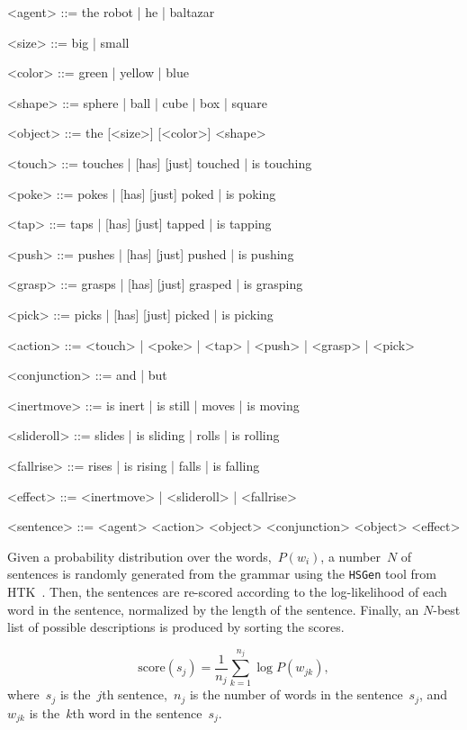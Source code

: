 \begin{grammar}
  <agent> ::= the robot | he | baltazar

  <size> ::= big | small

  <color> ::= green | yellow | blue

  <shape> ::= sphere | ball | cube | box | square

  <object> ::= the [<size>] [<color>] <shape>

  <touch> ::= touches | [has] [just] touched | is touching

  <poke> ::= pokes | [has] [just] poked | is poking

  <tap> ::= taps | [has] [just] tapped | is tapping

  <push> ::= pushes | [has] [just] pushed | is pushing

  <grasp> ::= grasps | [has] [just] grasped | is grasping

  <pick> ::= picks | [has] [just] picked | is picking

  <action> ::= <touch> | <poke> | <tap> | <push> | <grasp> | <pick>

  <conjunction> ::= and | but

  <inertmove> ::= is inert | is still | moves | is moving

  <slideroll> ::= slides | is sliding | rolls | is rolling

  <fallrise> ::= rises | is rising | falls | is falling

  <effect> ::= <inertmove> | <slideroll> | <fallrise>

  <sentence> ::= <agent> <action> <object> <conjunction> <object> <effect>
\end{grammar}

Given a probability distribution over the words,~$P(w_i)$, a number~$N$ of sentences is randomly generated from the grammar using the \texttt{HSGen} tool from HTK~\cite{young:htkbook}.
Then, the sentences are re-scored according to the log-likelihood of each word in the sentence, normalized by the length of the sentence.
Finally, an $N$-best list of possible descriptions is produced by sorting the scores.

\begin{equation*}
  \text{score}(s_j) = \frac{1}{n_j} \sum_{k=1}^{n_j} \log P(w_{jk}),
\end{equation*}
where~$s_j$ is the~$j$th sentence,~$n_j$ is the number of words in the sentence~$s_j$, and~$w_{jk}$ is the~$k$th word in the sentence~$s_j$.
